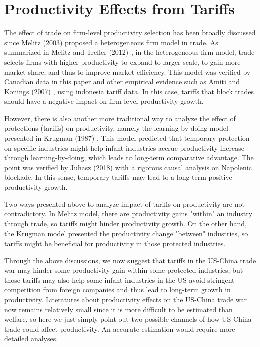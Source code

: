 \documentclass[12pt]{article}
\begin{document}
\section{Productivity Effects from Tariffs}
\label{sec:productivity}
The effect of trade on firm-level productivity selection has been broadly discussed since Melitz (2003) \cite{melitz2003impact} proposed a heterogeneous firm model in trade.
As summarized in Melitz and Trefler (2012) \cite{melitz2012gains}, in the heterogeneous firm model, trade selects firms with higher productivity to expand to larger scale, to gain more market share, and thus to improve market efficiency. 
This model was verified by Canadian data in this paper and other empirical evidence such as Amiti and Konings (2007) \cite{amiti2007trade}, using indonesia tariff data.
In this case, tariffs that block trades should have a negative impact on firm-level productivity growth. 

However, there is also another more traditional way to analyze the effect of protections (tariffs) on productivity, namely the learning-by-doing model presented in Krugman (1987) \cite{krugman1987narrow}. 
This model predicted that temporary protection on specific industries might help infant industries accrue productivity increase through learning-by-doing, which leads to long-term comparative advantage.
The point was verified by Juhasz (2018) \cite{juhasz2018temporary} with a rigorous causal analysis on Napolenic blockade.
In this sense, temporary tariffs may lead to a long-term positive productivity growth.

Two ways presented above to analyze impact of tariffs on productivity are not contradictory. 
In Melitz model, there are productivity gains "within" an industry through trade, so tariffs might hinder productivity growth.
On the other hand, the Krugman model presented the productivity change "between" industries, so tariffs might be beneficial for productivity in those protected industries.

Through the above discussions, we now suggest that tariffs in the US-China trade war may hinder some productivity gain within some protected industries, 
but those tariffs may also help some infant industries in the US avoid stringent competition from foreign companies and thus lead to long-term growth in productivity. 
Literatures about productivity effects on the US-China trade war now remains relatively small since it is more difficult to be estimated than welfare, 
so here we just simply point out two possible channels of how US-China trade could affect productivity. An accurate estimation would require more detailed analyses.
\end{document}
